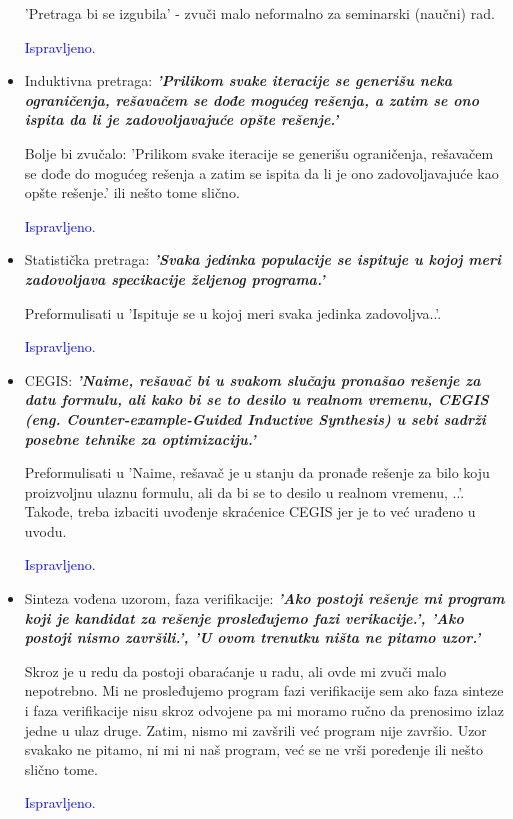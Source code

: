 \documentclass[a4paper]{report}
\newcommand{\odgovor}[1]{\textcolor{blue}{#1}}
\begin{document}
\begin{itemize}
    'Pretraga bi se izgubila' - zvuči malo neformalno za seminarski (naučni) rad.

    \odgovor {Ispravljeno.}

    \item Induktivna pretraga: \textbf{\textit{'Prilikom svake iteracije se generišu neka ograničenja, rešavačem se dođe mogućeg rešenja, a zatim se ono ispita da li je zadovoljavajuće opšte
rešenje.'}}

	Bolje bi zvučalo: 'Prilikom svake iteracije se generišu ograničenja, rešavačem se dođe do mogućeg rešenja a zatim se ispita da li je ono zadovoljavajuće kao opšte rešenje.' ili nešto tome slično.

    \odgovor {Ispravljeno.}

    \item Statistička pretraga: \textbf{\textit{'Svaka jedinka populacije se ispituje u kojoj meri zadovoljava specikacije željenog programa.'}}

    Preformulisati u 'Ispituje se u kojoj meri svaka jedinka zadovoljva..'.

    \odgovor {Ispravljeno.}

    \item CEGIS: \textbf{\textit{'Naime, rešavač bi u svakom slučaju pronašao rešenje za datu formulu, ali kako bi se to desilo u realnom vremenu, CEGIS (eng. Counter-example-Guided Inductive Synthesis) u sebi sadrži posebne tehnike za optimizaciju.'}}

    Preformulisati u 'Naime, rešavač je u stanju da pronađe rešenje za bilo koju proizvoljnu ulaznu formulu, ali da bi se to desilo u realnom vremenu, ..'. Takođe, treba izbaciti uvođenje skraćenice CEGIS jer je to već urađeno u uvodu.

    \odgovor {Ispravljeno.}

    \item Sinteza vođena uzorom, faza verifikacije: \textbf{\textit{'Ako postoji rešenje mi program koji je kandidat za rešenje prosleđujemo fazi verikacije.', 'Ako postoji nismo završili.', 'U ovom trenutku ništa ne pitamo uzor.'}}

    Skroz je u redu da postoji obaraćanje u radu, ali ovde mi zvuči malo nepotrebno. Mi ne prosleđujemo program fazi verifikacije sem ako faza sinteze i faza verifikacije nisu skroz odvojene pa mi moramo ručno da prenosimo izlaz jedne u ulaz druge. Zatim, nismo mi zavšrili već program nije završio. Uzor svakako ne pitamo, ni mi ni naš program, već se ne vrši poređenje ili nešto slično tome.

    \odgovor{Ispravljeno.}

\end{itemize}
\end{document}
